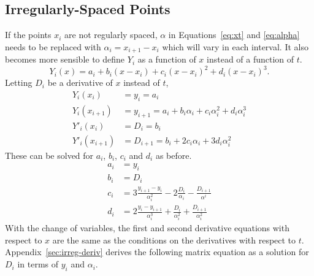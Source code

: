 \documentclass{scrartcl}
\begin{document}
\subsection{Irregularly-Spaced Points}
If the points $x_i$ are not regularly spaced, $\alpha$ in
Equations~\ref{eq:xt} and \ref{eq:alpha} needs to be replaced
with $\alpha_i = x_{i+1}-x_i$ which will vary in each interval.
It also becomes
more sensible to define $Y_i$ as a function of $x$ instead of
a function of $t$.
\begin{equation}
Y_i(x) = a_i + b_i (x-x_i) + c_i(x-x_i)^2 + d_i (x-x_i)^3 .
\end{equation}
Letting $D_i$ be a derivative of $x$ instead of $t$,
\begin{align}
Y_i(x_i)&=y_i = a_i \label{eq:Yii}\\
Y_i(x_{i+1})&=y_{i+1} = a_i + b_i\alpha_i + c_i\alpha_i^2 + d_i\alpha_i^3\\
Y'_i(x_i) &= D_i = b_i\\
Y'_i(x_{i+1}) &= D_{i+1} =
	b_i + 2 c_i \alpha_i + 3 d_i \alpha_i^2 \label{eq:Yp1}
\end{align}
These can be solved for $a_i$, $b_i$, $c_i$ and $d_i$ as before.
\begin{align}
a_i &= y_i\\
b_i &= D_i\\
c_i &= 3\frac{y_{i+1}-y_i}{\alpha_i^2}-2\frac{D_i}{\alpha_i}-\frac{D_{i+1}}{\alpha^i} \label{eq:cirreg}\\
d_i &= 2\frac{y_i-y_{i+1}}{\alpha_i^3}+\frac{D_i}{\alpha_i^2}+\frac{D_{i+1}}{\alpha_i^2}\label{eq:dirreg}
\end{align}
With the change of variables,
the first and second derivative equations with
respect to $x$ are the same as the conditions on the
derivatives with respect to $t$.
Appendix~\ref{sec:irreg-deriv} derives the following
matrix equation as a solution for $D_i$ in terms of
$y_i$ and $\alpha_i$.
\end{document}
